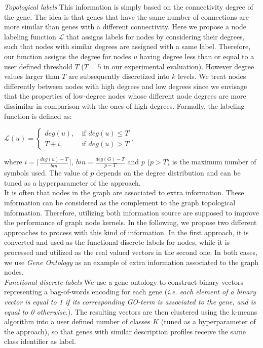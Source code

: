\documentclass[review]{elsarticle}
\begin{document}
\textit{Topological labels} This information is simply based on the connectivity degree of the gene. The idea is that genes that have the same number of connections are more similar than genes with a different connectivity. Here we propose a node labeling function $\mathcal{L}$ that assigns labels for nodes by considering their degrees, such that nodes with similar degrees are assigned with a same label. Therefore, our function assigns the degree for nodes $u$ having degree less than or equal to a user defined threshold $T$ ($T=5$ in our experimental evaluation). However degree values larger than $T$ are subsequently discretized into $k$ levels. We treat nodes differently between nodes with high degrees and low degrees since we envisage that the properties of low-degree nodes whose different node degrees are more dissimilar in comparison with the ones of high degrees. Formally, the labeling function is defined as:
\begin{center}
$\mathcal{L}(u) = \left\{
	\begin{array}{ll}
		deg(u),\  & \mbox{if } deg(u) \leq T \\
		T+i,\ & \mbox{if } deg(u) > T
	\end{array}
\right.$,
\end{center}
where $i = \lceil \frac{deg(u)-T}{bin}\rceil$, $bin = \frac{deg(G)-T}{p - T}$ and $p$ ($p > T$) is the maximum number of symbols used. The value of $p$ depends on the degree distribution and can be tuned as a hyperparameter of the approach.\\


It is often that nodes in the graph are associated to extra information. These information can be considered as the complement to the graph topological information. Therefore, utilizing both information source are supposed to improve the performance of graph node kernels. In the following, we propose two different approaches to process with this kind of information. In the first approach, it is converted and used as the functional discrete labels for nodes, while it is processed and utilized as the real valued vectors in the second one. In both cases, we use \textit{Gene Ontology} \cite{gene2004gene} as an example of extra information associated to the graph nodes.\\

\textit{Functional discrete labels}
We use a gene ontology to construct binary vectors representing a bag-of-words encoding for each gene (\textit{i.e. each element of a binary vector is equal to 1 if its corresponding GO-term is associated to the gene, and is equal to 0 otherwise.}). The resulting vectors are then clustered using the k-means algorithm  into a user defined number of classes $K$ (tuned as a hyperparameter of the approach), so that genes with similar description profiles receive the same class identifier as label.\\
\end{document}
